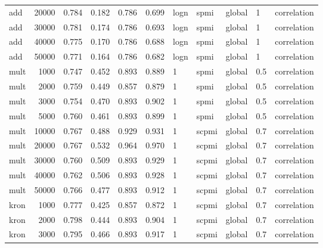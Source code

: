 \begin{tabular}{lrrrrrlllll}
     add &           20000 &  0.784 &  0.182 &      0.786 &          0.699 &  logn &   spmi &  global &    1 &    correlation \\
     add &           30000 &  0.781 &  0.174 &      0.786 &          0.693 &  logn &   spmi &  global &    1 &    correlation \\
     add &           40000 &  0.775 &  0.170 &      0.786 &          0.688 &  logn &   spmi &  global &    1 &    correlation \\
     add &           50000 &  0.771 &  0.164 &      0.786 &          0.682 &  logn &   spmi &  global &    1 &    correlation \\
    mult &            1000 &  0.747 &  0.452 &      0.893 &          0.889 &     1 &   spmi &  global &  0.5 &    correlation \\
    mult &            2000 &  0.759 &  0.449 &      0.857 &          0.879 &     1 &   spmi &  global &  0.5 &    correlation \\
    mult &            3000 &  0.754 &  0.470 &      0.893 &          0.902 &     1 &   spmi &  global &  0.5 &    correlation \\
    mult &            5000 &  0.760 &  0.461 &      0.893 &          0.899 &     1 &   spmi &  global &  0.5 &    correlation \\
    mult &           10000 &  0.767 &  0.488 &      0.929 &          0.931 &     1 &  scpmi &  global &  0.7 &    correlation \\
    mult &           20000 &  0.767 &  0.532 &      0.964 &          0.970 &     1 &  scpmi &  global &  0.7 &    correlation \\
    mult &           30000 &  0.760 &  0.509 &      0.893 &          0.929 &     1 &  scpmi &  global &  0.7 &    correlation \\
    mult &           40000 &  0.762 &  0.506 &      0.893 &          0.928 &     1 &  scpmi &  global &  0.7 &    correlation \\
    mult &           50000 &  0.766 &  0.477 &      0.893 &          0.912 &     1 &  scpmi &  global &  0.7 &    correlation \\
    kron &            1000 &  0.777 &  0.425 &      0.857 &          0.872 &     1 &  scpmi &  global &  0.7 &    correlation \\
    kron &            2000 &  0.798 &  0.444 &      0.893 &          0.904 &     1 &  scpmi &  global &  0.7 &    correlation \\
    kron &            3000 &  0.795 &  0.466 &      0.893 &          0.917 &     1 &  scpmi &  global &  0.7 &    correlation \\

\end{tabular}
